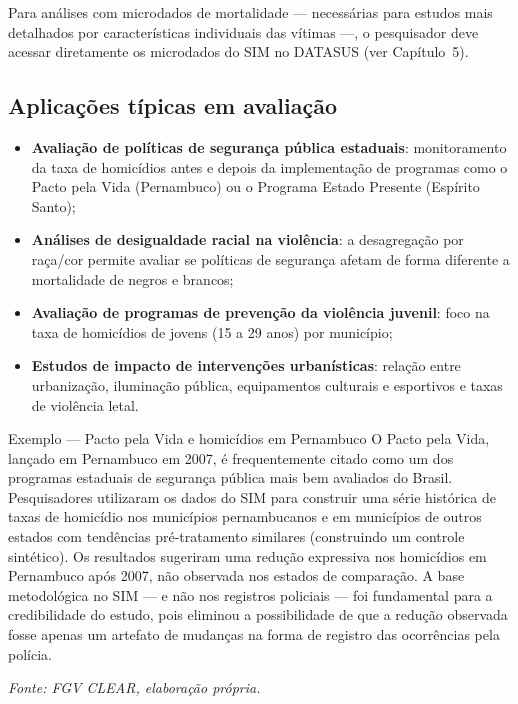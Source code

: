 Para análises com microdados de mortalidade --- necessárias para estudos mais detalhados por características individuais das vítimas ---, o pesquisador deve acessar diretamente os microdados do SIM no DATASUS (ver Capítulo~5).

\subsection{Aplicações típicas em avaliação}

\begin{itemize}
  \item \textbf{Avaliação de políticas de segurança pública estaduais}: monitoramento da taxa de homicídios antes e depois da implementação de programas como o Pacto pela Vida (Pernambuco) ou o Programa Estado Presente (Espírito Santo);
  \item \textbf{Análises de desigualdade racial na violência}: a desagregação por raça/cor permite avaliar se políticas de segurança afetam de forma diferente a mortalidade de negros e brancos;
  \item \textbf{Avaliação de programas de prevenção da violência juvenil}: foco na taxa de homicídios de jovens (15 a 29 anos) por município;
  \item \textbf{Estudos de impacto de intervenções urbanísticas}: relação entre urbanização, iluminação pública, equipamentos culturais e esportivos e taxas de violência letal.
\end{itemize}

\begin{boxexemplo}{Exemplo --- Pacto pela Vida e homicídios em Pernambuco}
O Pacto pela Vida, lançado em Pernambuco em 2007, é frequentemente citado como um dos programas estaduais de segurança pública mais bem avaliados do Brasil. Pesquisadores utilizaram os dados do SIM para construir uma série histórica de taxas de homicídio nos municípios pernambucanos e em municípios de outros estados com tendências pré-tratamento similares (construindo um controle sintético). Os resultados sugeriram uma redução expressiva nos homicídios em Pernambuco após 2007, não observada nos estados de comparação. A base metodológica no SIM --- e não nos registros policiais --- foi fundamental para a credibilidade do estudo, pois eliminou a possibilidade de que a redução observada fosse apenas um artefato de mudanças na forma de registro das ocorrências pela polícia.

\textit{Fonte: FGV CLEAR, elaboração própria.}
\end{boxexemplo}

